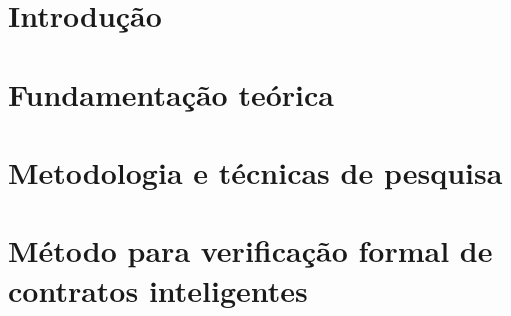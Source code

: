 \documentclass[qualificacao, mestrado]{packages/icmc}
\begin{document}
\textual

\chapter{Introdução}
\label{cap:introducao}


\chapter{Fundamentação teórica}
\label{cap:fundamentacao}


\chapter{Metodologia e técnicas de pesquisa}
\label{cap:revisao}




\chapter{Método para verificação formal de contratos inteligentes}
\label{cap:proposta}



%


% 








\glsaddall
\printglossaries


%
\end{document}
